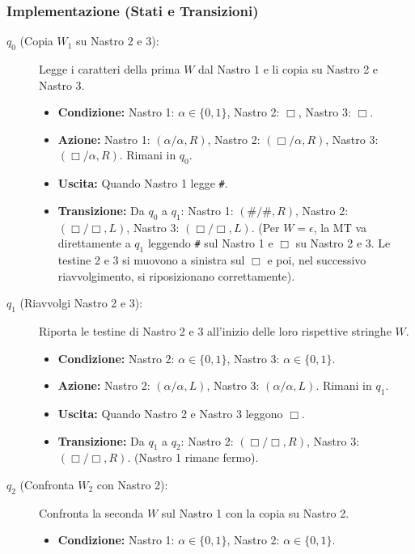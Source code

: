 \documentclass[a4paper, 11pt]{book} %
\theoremstyle{definition}
\begin{document}
\subsubsection{Implementazione (Stati e Transizioni)}
\begin{description}
    \item[$q_0$ (Copia $W_1$ su Nastro 2 e 3):] Legge i caratteri della prima $W$ dal Nastro 1 e li copia su Nastro 2 e Nastro 3.
    \begin{itemize}
        \item \textbf{Condizione:} Nastro 1: $\alpha \in \{0,1\}$, Nastro 2: $\Box$, Nastro 3: $\Box$.
        \item \textbf{Azione:} Nastro 1: $(\alpha/\alpha, R)$, Nastro 2: $(\Box/\alpha, R)$, Nastro 3: $(\Box/\alpha, R)$. Rimani in $q_0$.
        \item \textbf{Uscita:} Quando Nastro 1 legge \texttt{\#}.
        \item \textbf{Transizione:} Da $q_0$ a $q_1$: Nastro 1: $(\#/\#, R)$, Nastro 2: $(\Box/\Box, L)$, Nastro 3: $(\Box/\Box, L)$. (Per $W=\epsilon$, la MT va direttamente a $q_1$ leggendo \texttt{\#} sul Nastro 1 e $\Box$ su Nastro 2 e 3. Le testine 2 e 3 si muovono a sinistra sul $\Box$ e poi, nel successivo riavvolgimento, si riposizionano correttamente).
    \end{itemize}
    \item[$q_1$ (Riavvolgi Nastro 2 e 3):] Riporta le testine di Nastro 2 e 3 all'inizio delle loro rispettive stringhe $W$.
    \begin{itemize}
        \item \textbf{Condizione:} Nastro 2: $\alpha \in \{0,1\}$, Nastro 3: $\alpha \in \{0,1\}$.
        \item \textbf{Azione:} Nastro 2: $(\alpha/\alpha, L)$, Nastro 3: $(\alpha/\alpha, L)$. Rimani in $q_1$.
        \item \textbf{Uscita:} Quando Nastro 2 e Nastro 3 leggono $\Box$.
        \item \textbf{Transizione:} Da $q_1$ a $q_2$: Nastro 2: $(\Box/\Box, R)$, Nastro 3: $(\Box/\Box, R)$. (Nastro 1 rimane fermo).
    \end{itemize}
    \item[$q_2$ (Confronta $W_2$ con Nastro 2):] Confronta la seconda $W$ sul Nastro 1 con la copia su Nastro 2.
    \begin{itemize}
        \item \textbf{Condizione:} Nastro 1: $\alpha \in \{0,1\}$, Nastro 2: $\alpha \in \{0,1\}$.

\end{itemize}
\end{description}
\end{document}
